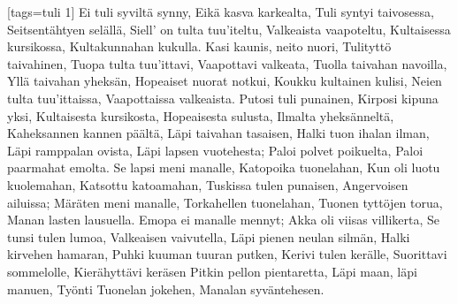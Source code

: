 [tags={tuli 1}]
  \beginverse
    Ei tuli syviltä synny,
    Eikä kasva karkealta,
    Tuli syntyi taivosessa,
    Seitsentähtyen selällä,
    Siell' on tulta tuu'iteltu,
    Valkeaista vaapoteltu,
    Kultaisessa kursikossa,
    Kultakunnahan kukulla.
  \endverse
  \beginverse
    Kasi kaunis, neito nuori,
    Tulityttö taivahinen,
    Tuopa tulta tuu'ittavi,
    Vaapottavi valkeata,
    Tuolla taivahan navoilla,
    Yllä taivahan yheksän,
    Hopeaiset nuorat notkui,
    Koukku kultainen kulisi,
    Neien tulta tuu'ittaissa,
    Vaapottaissa valkeaista.
  \endverse
  \beginverse
    Putosi tuli punainen,
    Kirposi kipuna yksi,
    Kultaisesta kursikosta,
    Hopeaisesta sulusta,
    Ilmalta yheksänneltä,
    Kaheksannen kannen päältä,
    Läpi taivahan tasaisen,
    Halki tuon ihalan ilman,
    Läpi ramppalan ovista,
    Läpi lapsen vuotehesta;
    Paloi polvet poikuelta,
    Paloi paarmahat emolta.
  \endverse
  \beginverse
    Se lapsi meni manalle,
    Katopoika tuonelahan,
    Kun oli luotu kuolemahan,
    Katsottu katoamahan,
    Tuskissa tulen punaisen,
    Angervoisen ailuissa;
    Märäten meni manalle,
    Torkahellen tuonelahan,
    Tuonen tyttöjen torua,
    Manan lasten lausuella.
  \endverse
  \beginverse
    Emopa ei manalle mennyt;
    Akka oli viisas villikerta,
    Se tunsi tulen lumoa,
    Valkeaisen vaivutella,
    Läpi pienen neulan silmän,
    Halki kirvehen hamaran,
    Puhki kuuman tuuran putken,
    Kerivi tulen kerälle,
    Suorittavi sommelolle,
    Kierähyttävi keräsen
    Pitkin pellon pientaretta,
    Läpi maan, läpi manuen,
    Työnti Tuonelan jokehen,
    Manalan syväntehesen.
  \endverse
\endsong



